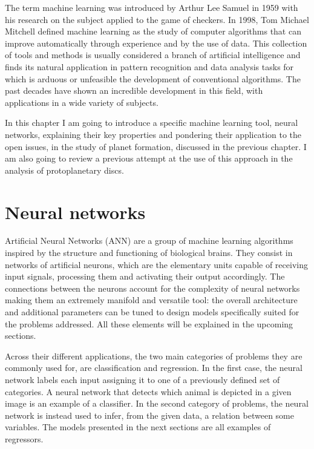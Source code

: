 \documentclass[a4paper,10pt]{report}
\begin{document}

The term machine learning was introduced by Arthur Lee Samuel in 1959
with his research on the subject applied to the game of checkers.
In 1998, Tom Michael Mitchell defined machine learning as the study of
computer algorithms that can improve automatically through experience and by the use of data.
This collection of tools and methods is usually considered a branch of artificial intelligence and 
finds its natural application in pattern recognition and data analysis tasks for which is arduous or
unfeasible the development of conventional algorithms.
The past decades have shown an incredible development in this field,
with applications in a wide variety of subjects.

In this chapter I am going to introduce a specific machine learning tool, neural networks, explaining
their key properties and pondering their application to the open issues, in the study of planet formation,
discussed in the previous chapter. I am also going to review a previous attempt at the use of this approach in the 
analysis of protoplanetary discs.

\section{Neural networks}

Artificial Neural Networks (ANN) are a group of machine learning algorithms inspired by the structure and functioning 
of biological brains.
They consist in networks of artificial neurons,
which are the elementary units capable of receiving input signals, processing
them and activating their output accordingly. The connections between the neurons account for 
the complexity of neural networks making them an extremely manifold and versatile tool:
the overall architecture and additional parameters can be tuned to design 
models specifically suited for the problems addressed.
All these elements will be explained in the upcoming sections.

Across their different applications, the two main categories of problems they are commonly used for, are 
classification and regression. In the first case, the neural network labels
each input assigning it to one of a previously defined set of categories.
A neural network that detects which animal is depicted in a given image is an example of a classifier.
In the second category of problems, the neural network is instead used to infer, from the given data, a relation
between some variables.
The models presented in the next sections are all examples of regressors.
\end{document}
